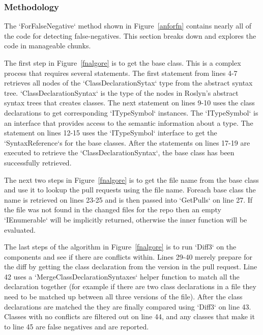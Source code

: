 \documentclass[draftclsnofoot,onecolumn]{IEEEtran}
\begin{document}
\subsubsection{Methodology}

The `ForFalseNegative` method shown in Figure~\ref{anforfn} contains nearly 
all of the code for detecting false-negatives. This section breaks down and 
explores the code in manageable chunks.

The first step in Figure~\ref{fnalgore} is to get the base class. This is a 
complex process that requires several statements. The first statement from 
lines 4-7 retrieves all nodes of the  `ClassDeclarationSytax` type from the 
abstract syntax tree. `ClassDeclarationSyntax` is the type of the nodes in 
Roslyn’s abstract syntax trees that creates classes. The next statement on 
lines 9-10 uses the class declarations to get corresponding `ITypeSymbol` 
instances. The `ITypeSymbol` is an interface that provides access to the 
semantic information about a type. The statement on lines 12-15 uses the 
`ITypeSymbol` interface to get the `SyntaxReference`s for the base classes. 
After the statements on lines 17-19 are executed to retrieve the 
`ClassDeclarationSyntax`, the base class has been successfully retrieved.

The next two steps in Figure~\ref{fnalgore} is to get the file name from the 
base class and use it to lookup the pull requests using the file name. 
Foreach base class the name is retrieved on lines 23-25 and is then passed 
into `GetPulls` on line 27. If the file was not found in the changed files 
for the repo then an empty `IEnumerable` will be implicitly returned, 
otherwise the inner function will be evaluated.

The last steps of the algorithm in Figure~\ref{fnalgore} is to run `Diff3` 
on the components and see if there are conflicts within. Lines 29-40 merely 
prepare for the diff by getting the class declaration from the version in 
the pull request. Line 42 uses a `MergeClassDeclarationSyntaxes` helper 
function to match all the declaration together (for example if there are two 
class declarations in a file they need to be matched up between all three 
versions of the file). After the class declarations are matched the they are 
finally compared using `Diff3` on line 43. Classes with no conflicts are 
filtered out on line 44, and any classes that make it to line 45 are false 
negatives and are reported.
\end{document}
